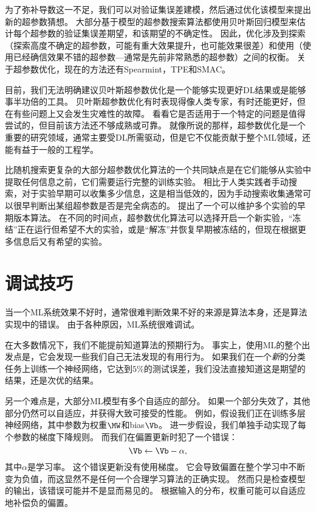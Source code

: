 为了弥补导数这一不足，我们可以对验证集误差建模，然后通过优化该模型来提出新的超参数猜想。
大部分基于模型的超参数搜索算法都使用贝叶斯回归模型来估计每个超参数的验证集误差期望，和该期望的不确定性。
因此，优化涉及到探索（探索高度不确定的超参数，可能有重大效果提升，也可能效果很差）和使用（使用已经确信效果不错的超参数---通常是先前非常熟悉的超参数）之间的权衡。
关于超参数优化，现在的方法还有Spearmint\citep{Snoek+al-NIPS2012-small}，TPE\citep{Bergstra+al-NIPS2011}和SMAC\citep{hutter+hoos+leyton+brown:2011}。

目前，我们无法明确建议贝叶斯超参数优化是一个能够实现更好\gls{DL}结果或是能够事半功倍的工具。
贝叶斯超参数优化有时表现得像人类专家，有时还能更好，但在有些问题上又会发生灾难性的故障。
看看它是否适用于一个特定的问题是值得尝试的，但目前该方法还不够成熟或可靠。
就像所说的那样，超参数优化是一个重要的研究领域，通常主要受\gls{DL}所需驱动，但是它不仅能贡献于整个\gls{ML}领域，还能有益于一般的工程学。


比随机搜索更复杂的大部分超参数优化算法的一个共同缺点是在它们能够从实验中提取任何信息之前，它们需要运行完整的训练实验。
相比于人类实践者手动搜索，对于实验早期可以收集多少信息，这是相当低效的，因为手动搜索收集通常可以很早判断出某组超参数是否是完全病态的。
\cite{swersky2014freeze}提出了一个可以维护多个实验的早期版本算法。
在不同的时间点，超参数优化算法可以选择开启一个新实验，“冻结”正在运行但希望不大的实验，或是“解冻”并恢复早期被冻结的，但现在根据更多信息后又有希望的实验。

\section{调试技巧}
\label{sec:debugging_strategies}
当一个\gls{ML}系统效果不好时，通常很难判断效果不好的来源是算法本身，还是算法实现中的错误。
由于各种原因，\gls{ML}系统很难调试。

在大多数情况下，我们不能提前知道算法的预期行为。
事实上，使用\gls{ML}的整个出发点是，它会发现一些我们自己无法发现的有用行为。
如果我们在一个\emph{新}的分类任务上训练一个神经网络，它达到$5\%$的测试误差，我们没法直接知道这是期望的结果，还是次优的结果。

另一个难点是，大部分\gls{ML}模型有多个自适应的部分。
如果一个部分失效了，其他部分仍然可以自适应，并获得大致可接受的性能。
例如，假设我们正在训练多层神经网络，其中参数为权重$\MW$和\gls{bias}$\Vb$。
进一步假设，我们单独手动实现了每个参数的梯度下降规则。
而我们在偏置更新时犯了一个错误：
\begin{equation}
	\Vb \leftarrow \Vb - \alpha,
\end{equation}
其中$\alpha$是学习率。
这个错误更新没有使用梯度。
它会导致偏置在整个学习中不断变为负值，而这显然不是任何一个合理学习算法的正确实现。
然而只是检查模型的输出，该错误可能并不是显而易见的。
根据输入的分布，权重可能可以自适应地补偿负的偏置。

